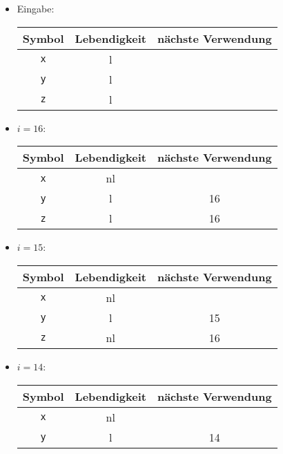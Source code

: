 \documentclass[a4paper,10pt]{scrartcl}
\begin{document}
\section{}
\begin{itemize}
 \item Eingabe:
\begin{center}
\begin{tabular}{c|c|c}
 Symbol     & Lebendigkeit & nächste Verwendung \\\hline
 \texttt{x} & l            &                    \\
 \texttt{y} & l            &                    \\
 \texttt{z} & l            &                    \\
\end{tabular}
\end{center}
 \item $i = 16$:
\begin{center}
\begin{tabular}{c|c|c}
 Symbol     & Lebendigkeit & nächste Verwendung \\\hline
 \texttt{x} & nl           &                    \\
 \texttt{y} & l            & 16                 \\
 \texttt{z} & l            & 16                 \\
\end{tabular}
\end{center}
 \item $i = 15$:
\begin{center}
\begin{tabular}{c|c|c}
 Symbol     & Lebendigkeit & nächste Verwendung \\\hline
 \texttt{x} & nl           &                    \\
 \texttt{y} & l            & 15                 \\
 \texttt{z} & nl           & 16                 \\
\end{tabular}
\end{center}
 \item $i = 14$:
\begin{center}
\begin{tabular}{c|c|c}
 Symbol     & Lebendigkeit & nächste Verwendung \\\hline
 \texttt{x} & nl           &                    \\
 \texttt{y} & l            & 14                 \\

\end{tabular}
\end{center}
\end{itemize}
\end{document}

